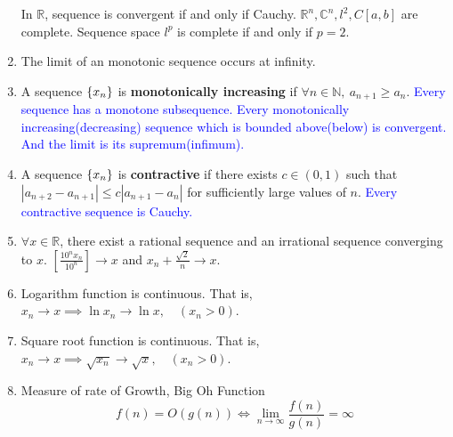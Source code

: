 \begin{enumerate}
		\subitem In $\mathbb{R}$, sequence is convergent if and only if Cauchy.
		\subitem $\mathbb{R}^n,\mathbb{C}^n,l^2,C[a,b]$ are complete.
		\subitem Sequence space $l^p$ is complete if and only if $p=2$.
	\item The limit of an monotonic sequence occurs at infinity.
	\item A sequence $\{x_n\}$ is \textbf{monotonically increasing} if $\forall n \in \mathbb{N},\ a_{n+1} \ge a_n$.
		\subitem \textcolor{blue}{Every sequence has a monotone subsequence.}
		\subitem \textcolor{blue}{Every monotonically increasing(decreasing) sequence which is bounded above(below) is convergent. And the limit is its supremum(infimum).}
	\item A sequence $\{x_n\}$ is \textbf{contractive} if there exists $c \in (0,1)$ such that $|a_{n+2}-a_{n+1}| \le c|a_{n+1}-a_n|$ for sufficiently large values of $n$.
		\subitem \textcolor{blue}{Every contractive sequence is Cauchy.}
	\item $\forall x \in \mathbb{R}$, there exist a rational sequence and an irrational sequence converging to $x$.
		$\left[ \frac{10^n x_n}{10^n} \right] \to x$ and $ x_n + \frac{\sqrt{2}}{n} \to x$.
	\item Logarithm function is continuous.
		That is, $x_n \to x \implies \ln{x_n} \to \ln{x}, \quad (x_n > 0)$.
	\item Square root function is continuous.
		That is, $x_n \to x \implies \sqrt{x_n} \to \sqrt{x}, \quad (x_n > 0)$.
	\item Measure of rate of Growth, Big Oh Function
	$$ f(n) = O(g(n)) \iff \lim_{n \to \infty} \frac{f(n)}{g(n)} = \infty $$
\end{enumerate}
